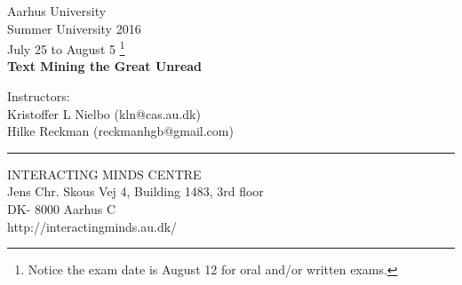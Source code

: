 \documentclass[12pt,a4paper]{article}
\author{Kristoffer L. Nielbo}
\begin{document}

\begin{center}
{\large Aarhus University}\\
\bigskip
{\large Summer University 2016}\\
July 25 to August 5 \footnote{Notice the exam date is August 12 for oral and/or written exams.}\\
\bigskip
{\LARGE\textbf{Text Mining the Great Unread}}\\
\end{center}
\bigskip
Instructors:\\
Kristoffer L Nielbo (kln@cas.au.dk) \\ 
Hilke Reckman (reckmanhgb@gmail.com)\\
\noindent\rule{4cm}{0.4pt}
\bigskip

\noindent INTERACTING MINDS CENTRE\\ 
Jens Chr. Skous Vej 4, Building 1483, 3rd floor\\
DK- 8000 Aarhus C\\
http://interactingminds.au.dk/\\

\noindent\makebox[\linewidth]{\rule{\paperwidth}{0.4pt}}
\end{document}

